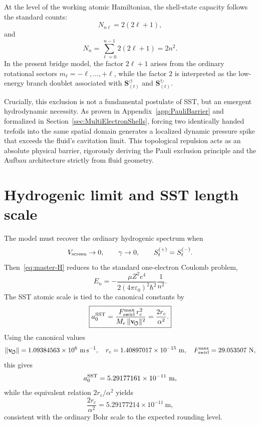 \documentclass[11pt,a4paper]{article}
\newcommand{\rc}{r_c}
\begin{document}
At the level of the working atomic Hamiltonian, the shell-state capacity follows the standard counts:
\begin{equation}
\label{eq:subshell-count}
N_{n\ell}=2(2\ell+1),
\end{equation}
and
\begin{equation}
\label{eq:shell-count}
N_n=\sum_{\ell=0}^{n-1}2(2\ell+1)=2n^2.
\end{equation}
In the present bridge model, the factor $2\ell+1$ arises from the ordinary rotational sectors $m_\ell=-\ell,\ldots,+\ell$, while the factor $2$ is interpreted as the low-energy branch doublet associated with $\mathbf{S}_{(t)}^{\!\boldsymbol{\circlearrowleft}}$ and $\mathbf{S}_{(t)}^{\!\boldsymbol{\circlearrowright}}$.

Crucially, this exclusion is not a fundamental postulate of SST, but an emergent hydrodynamic necessity. As proven in Appendix~\ref{app:PauliBarrier} and formalized in Section~\ref{sec:MultiElectronShells}, forcing two identically handed trefoils into the same spatial domain generates a localized dynamic pressure spike that exceeds the fluid's cavitation limit. This topological repulsion acts as an absolute physical barrier, rigorously deriving the Pauli exclusion principle and the Aufbau architecture strictly from fluid geometry.

\section{Hydrogenic limit and SST length scale}
The model must recover the ordinary hydrogenic spectrum when
\begin{equation}
V_{\rm screen}\to 0,
\qquad
\gamma\to 0,
\qquad
S_t^{(+)}=S_t^{(-)}.
\end{equation}
Then~\eqref{eq:master-H} reduces to the standard one-electron Coulomb problem,
\begin{equation}
\label{eq:En}
E_n=-\frac{\mu Z^2 e^4}{2(4\pi\varepsilon_0)^2\hbar^2}\frac{1}{n^2}.
\end{equation}
The SST atomic scale is tied to the canonical constants by
\begin{equation}
\label{eq:a0-sst}
\boxed{
a_0^{\rm SST}
=
\frac{F_{\rm swirl}^{\max}\,\rc^2}{M_e\,\lVert\mathbf{v}_{\!\boldsymbol{\circlearrowleft}}\rVert^2}
=
\frac{2\rc}{\alpha^2}.
}
\end{equation}
Using the canonical values
\begin{equation}
\lVert\mathbf{v}_{\!\boldsymbol{\circlearrowleft}}\rVert = 1.09384563\times 10^6\ \mathrm{m\,s^{-1}},
\quad
\rc = 1.40897017\times 10^{-15}\ \mathrm{m},
\quad
F_{\rm swirl}^{\max}=29.053507\ \mathrm{N},
\end{equation}
this gives
\begin{equation}
\label{eq:a0-num}
a_0^{\rm SST}
=
5.29177161\times 10^{-11}\ \mathrm{m},
\end{equation}
while the equivalent relation $2\rc/\alpha^2$ yields
\begin{equation}
\label{eq:a0-num2}
\frac{2\rc}{\alpha^2}=5.29177214\times 10^{-11}\ \mathrm{m},
\end{equation}
consistent with the ordinary Bohr scale to the expected rounding level.
\end{document}
